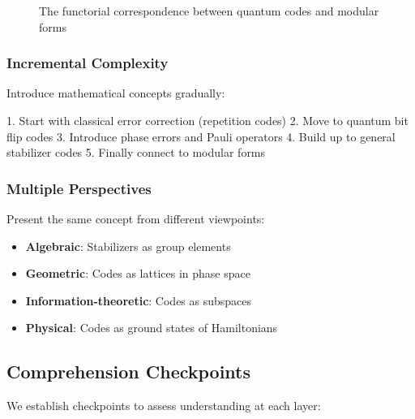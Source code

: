 \documentclass[11pt,a4paper]{article}
\newcommand{\C}{\mathbb{C}}
\newcommand{\HH}{\mathbb{H}}
\begin{document}
\begin{figure}[h]
\centering
{}
\caption{The functorial correspondence between quantum codes and modular forms}
\end{figure}

\subsubsection{Incremental Complexity}
Introduce mathematical concepts gradually:

1. Start with classical error correction (repetition codes)
2. Move to quantum bit flip codes
3. Introduce phase errors and Pauli operators  
4. Build up to general stabilizer codes
5. Finally connect to modular forms

\subsubsection{Multiple Perspectives}
Present the same concept from different viewpoints:
\begin{itemize}
\item \textbf{Algebraic}: Stabilizers as group elements
\item \textbf{Geometric}: Codes as lattices in phase space
\item \textbf{Information-theoretic}: Codes as subspaces
\item \textbf{Physical}: Codes as ground states of Hamiltonians
\end{itemize}

\subsection{Comprehension Checkpoints}

We establish checkpoints to assess understanding at each layer:
\end{document}
